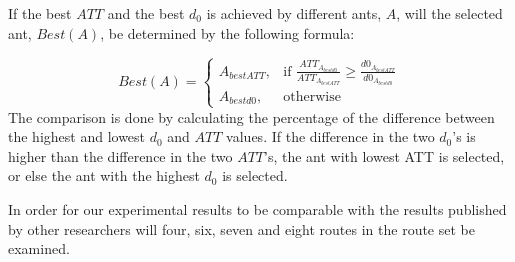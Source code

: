 If the best $ATT$ and the best $d_0$ is achieved by different ants, $A$, will the selected ant, $Best(A)$, be determined by the following formula:

\[
    Best(A)= 
\begin{cases}
    A_{bestATT},& \text{if } \frac{ATT_{A_{bestd0}}}{ATT_{A_{bestATT}}}\geq \frac{d0_{A_{bestATT}}}{d0_{A_{bestd0}}}\\
    A_{bestd0},& \text{otherwise}
\end{cases}
\]
The comparison is done by calculating the percentage of the difference between the highest and lowest $d_0$ and $ATT$ values. If the difference in the two $d_0$'s is higher than the difference in the two $ATT$'s, the ant with lowest ATT is selected, or else the ant with the highest $d_0$ is selected. %

In order for our experimental results to be comparable with the results published by other researchers will four, six, seven and eight routes in the route set be examined.








